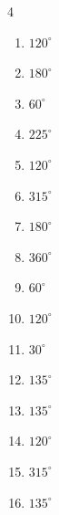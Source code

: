 \begin{multicols}{4}
\begin{enumerate}
  \item $\displaystyle 120^{\circ}$

  \item $\displaystyle 180^{\circ}$
        \phantom{$\displaystyle =\pi$}

  \item $\displaystyle 60^{\circ}$

  \item $\displaystyle 225^{\circ}$

  \item $\displaystyle 120^{\circ}$

  \item $\displaystyle 315^{\circ}$

  \item $\displaystyle 180^{\circ}$
        \phantom{$\displaystyle =\pi$}

  \item $\displaystyle 360^{\circ}$
        \phantom{$\displaystyle =2\pi$}

  \item $\displaystyle 60^{\circ}$

  \item $\displaystyle 120^{\circ}$

  \item $\displaystyle 30^{\circ}$

  \item $\displaystyle 135^{\circ}$

  \item $\displaystyle 135^{\circ}$

  \item $\displaystyle 120^{\circ}$

  \item $\displaystyle 315^{\circ}$

  \item $\displaystyle 135^{\circ}$


\end{enumerate}
\end{multicols}
